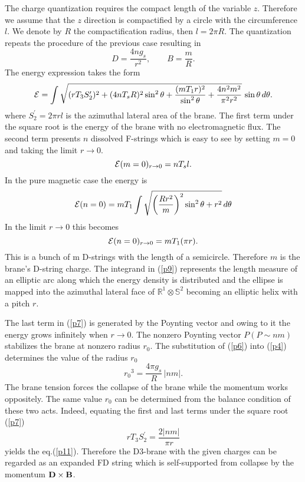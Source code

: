 \documentclass[a4paper,12pt]{article}
\begin{document}
The charge quantization requires the compact length of the variable $z$. 
Therefore we assume that the $z$ direction is compactified by a circle with 
the circumference $l$. We denote by $R$ the compactification radius, then 
$l=2\pi R$. 
The quantization repeats the procedure of the previous case 
resulting in
\begin{equation}
D=\frac{4ng_s}{r^2},\qquad B=\frac{m}{R}.
\label{p6}
\end{equation}
The energy expression takes the form
\begin{equation}
{\cal E}=\int \sqrt{(rT_3S_2^{\prime})^2+(4nT_sR)^2\sin^2\theta+
\frac{(mT_1r)^2}{\sin^2\theta}+\frac{4n^2m^2}{\pi^2r^2}}\,\sin\theta\,d\theta.
\label{p7}
\end{equation}
where $S_2^{\prime}=2\pi rl$ is the azimuthal lateral area of the brane.
The first term under the square root is the energy of the brane with no 
electromagnetic flux. The second term presents $n$ dissolved 
F-strings which is easy to see by setting $m=0$ and taking the limit 
$r\rightarrow 0$. 
\begin{equation}
{\cal E}(m=0)_{r\rightarrow 0}=nT_sl.
\label{p8}
\end{equation}
In the pure magnetic case the energy is
\begin{equation} 
{\cal E}(n=0)=mT_1\int \sqrt{\bigg(\frac{Rr^2}{m}\bigg)^2\sin^2\theta +r^2}
\,d\theta
\label{p9}
\end{equation}
In the limit $r\rightarrow 0$ this becomes
\begin{equation}
{\cal E}(n=0)_{r\rightarrow 0}=mT_1(\pi r).
\label{p10}
\end{equation}
This is a bunch of m D-strings with the length of a semicircle. Therefore $m$ 
is the brane's D-string charge. The integrand in (\ref{p9}) represents the 
length measure of an elliptic arc along which the energy density is 
distributed and the ellipse is mapped into the azimuthal lateral face of 
$\mathbb{R}^1\otimes \mathbb{S}^2$ becoming 
an elliptic helix with a pitch $r$.

The last term in (\ref{p7}) is generated by the 
Poynting vector and owing to it the energy grows infinitely 
when $r\rightarrow 0$. The nonzero Poynting vector $P(P\sim nm)$ 
stabilizes the brane at nonzero radius $r_0$. The substitution of 
(\ref{p6}) into  (\ref{p4}) determines the value of the radius $r_0$  
\begin{equation}
{r_0}^3=\frac{4\pi g_s}{R}\,|nm|.
\label{p11}
\end{equation}
The brane tension forces the collapse of the brane while the momentum 
works oppositely. The same value $r_0$ can be determined from the balance 
condition of these two acts. Indeed, equating the first and last 
terms under the square root (\ref{p7}) 
\begin{equation}
rT_3S_2^{\prime}=\frac{2|nm|}{\pi r}
\label{p12}
\end{equation}
yields the eq.(\ref{p11}).
Therefore the D3-brane with the given charges
can be regarded as an expanded FD string which is 
self-supported from collapse by the momentum ${\bf D}\times{\bf B}$.
\end{document}
